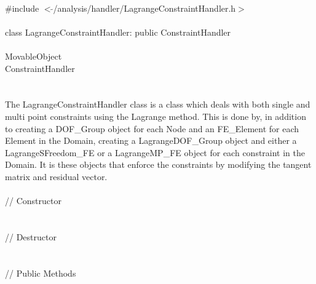 
   \\
\indent \#include $<\tilde{
}$/analysis/handler/LagrangeConstraintHandler.h$>$  \\ 

  \\
\indent class LagrangeConstraintHandler: public ConstraintHandler  \\

 \\
\indent MovableObject \\
\indent\indent ConstraintHandler \\
\indent\indent{} \\

 \\ 
\indent The LagrangeConstraintHandler class is a class which deals with
both single and multi point constraints using the Lagrange
method. This is done by, in addition to creating a DOF\_Group object
for each Node and an FE\_Element for each Element in the Domain,
creating a LagrangeDOF\_Group object and either a LagrangeSFreedom\_FE or a
LagrangeMP\_FE object for each constraint in the Domain. It is these
objects that enforce the constraints by modifying the tangent matrix
and residual vector. \\ 


 \\
\indent // Constructor \\
\\  \\ 
\indent // Destructor \\
\\  \\
\indent // Public Methods\\
 \\ 
 \\ \\
 \\
 \\


